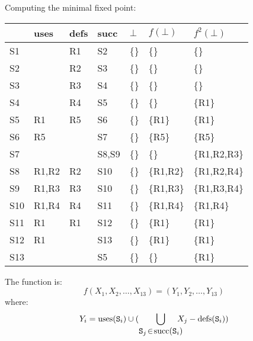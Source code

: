 \begin{slide*}
Computing the minimal fixed point:\\

\renewcommand{\arraystretch}{1}
\renewcommand{\tabcolsep}{1.0ex}
\begin{scriptsize}
\begin{tt}
\begin{tabular}{|l|l|l|l|l|l|l|}
\hline
 & {\rm uses} & {\rm defs} & {\rm succ} & $\bot$ & $f(\bot)$ & $f^2(\bot)$  \\\hline
S1 &      & R1& S2& \{\}& \{\}&  \{\}\\\hline
S2 &      & R2& S3& \{\}& \{\}& \{\} \\\hline
S3 &      & R3& S4& \{\}& \{\}& \{\} \\\hline
S4 &      & R4& S5& \{\}& \{\}& \{R1\} \\\hline
S5 & R1   & R5& S6& \{\}&\{R1\} & \{R1\}  \\\hline
S6 & R5   & & S7& \{\}& \{R5\}& \{R5\}\\\hline
S7 &      & & S8,S9& \{\}& \{\}& \{R1,R2,R3\} \\\hline
S8 & R1,R2& R2& S10& \{\}& \{R1,R2\}& \{R1,R2,R4\} \\\hline
S9 & R1,R3& R3& S10& \{\}& \{R1,R3\}& \{R1,R3,R4\} \\\hline
S10 & R1,R4& R4& S11& \{\}&  \{R1,R4\}& \{R1,R4\}\\\hline
S11 & R1& R1& S12& \{\}& \{R1\} & \{R1\}\\\hline
S12 & R1& & S13& \{\}&  \{R1\}& \{R1\}\\\hline
S13 &   & & S5& \{\}&  \{\}& \{R1\}\\\hline
\end{tabular}
\end{tt}
\end{scriptsize}
\vspace*{2ex}

The function is:
$$ f(X_1,X_2,\ldots,X_{13}) = (Y_1,Y_2,\ldots,Y_{13})$$
where:
$$ Y_i = \mbox{uses}(\mbox{\tt S}_i) \cup
         ( \bigcup_{\displaystyle \mbox{\tt S}_j\!\in\!\mbox{succ}(\mbox{\tt S}_i)}
           \!\!\!\!\!X_j - \mbox{defs}(\mbox{\tt S}_i) )$$
\vfil
\end{slide*}

